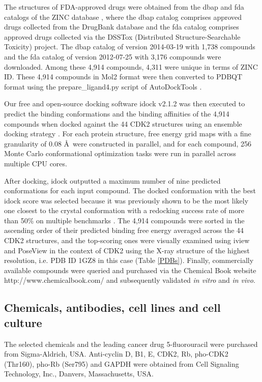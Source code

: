 \documentclass[10pt,letterpaper]{article}
\begin{document}
The structures of FDA-approved drugs were obtained from the dbap and fda catalogs of the ZINC database \cite{532,1178}, where the dbap catalog comprises approved drugs collected from the DrugBank database \cite{1594} and the fda catalog comprises approved drugs collected via the DSSTox (Distributed Structure-Searchable Toxicity) project. The dbap catalog of version 2014-03-19 with 1,738 compounds and the fda catalog of version 2012-07-25 with 3,176 compounds were downloaded. Among these 4,914 compounds, 4,311 were unique in terms of ZINC ID. These 4,914 compounds in Mol2 format were then converted to PDBQT format using the prepare\_ligand4.py script of AutoDockTools \cite{596}.

Our free and open-source docking software idock v2.1.2 \cite{1362} was then executed to predict the binding conformations and the binding affinities of the 4,914 compounds when docked against the 44 CDK2 structures using an ensemble docking strategy \cite{966,547,1128}. For each protein structure, free energy grid maps with a fine granularity of 0.08 \AA\ were constructed in parallel, and for each compound, 256 Monte Carlo conformational optimization tasks were run in parallel across multiple CPU cores.

After docking, idock outputted a maximum number of nine predicted conformations for each input compound. The docked conformation with the best idock score was selected because it was previously shown to be the most likely one closest to the crystal conformation with a redocking success rate of more than 50\% on multiple benchmarks \cite{1362}. The 4,914 compounds were sorted in the ascending order of their predicted binding free energy averaged across the 44 CDK2 structures, and the top-scoring ones were visually examined using iview \cite{1366} and PoseView \cite{748} in the context of CDK2 using the X-ray structure of the highest resolution, i.e. PDB ID 1GZ8 in this case (Table \ref{PDBs}). Finally, commercially available compounds were queried and purchased via the Chemical Book website http://www.chemicalbook.com/ and subsequently validated \textit{in vitro} and \textit{in vivo}.

\subsection*{Chemicals, antibodies, cell lines and cell culture}

The selected chemicals and the leading cancer drug 5-fluorouracil were purchased from Sigma-Aldrich, USA. Anti-cyclin D, B1, E, CDK2, Rb, pho-CDK2 (Thr160), pho-Rb (Ser795) and GAPDH were obtained from Cell Signaling Technology, Inc., Danvers, Massachusetts, USA.
\end{document}
